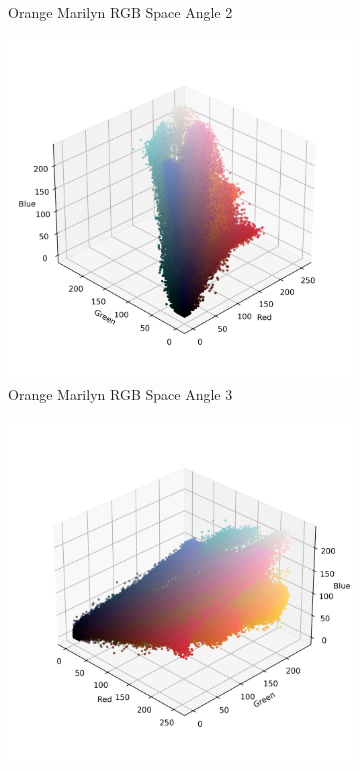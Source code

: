 \documentclass{article}
\begin{document}
\begin{figure}[ht]
\begin{subfigure}{0.24\textwidth}
    \caption{Orange Marilyn RGB Space Angle 2}
    \label{fig:4_2_orange_marilyn_original_scatter}
  \end{subfigure}
  \hfill
  \begin{subfigure}{0.24\textwidth}
    \includegraphics[width=\textwidth]{main_files/figure-latex/4_3_orange_marilyn_original_scatter.jpg}
    \caption{Orange Marilyn RGB Space Angle 3}
    \label{fig:4_3_orange_marilyn_original_scatter}
  \end{subfigure}
  \hfill
  \begin{subfigure}{0.24\textwidth}
    \includegraphics[width=\textwidth]{main_files/figure-latex/4_4_orange_marilyn_original_scatter.jpg}

\end{subfigure}
\end{figure}
\end{document}
